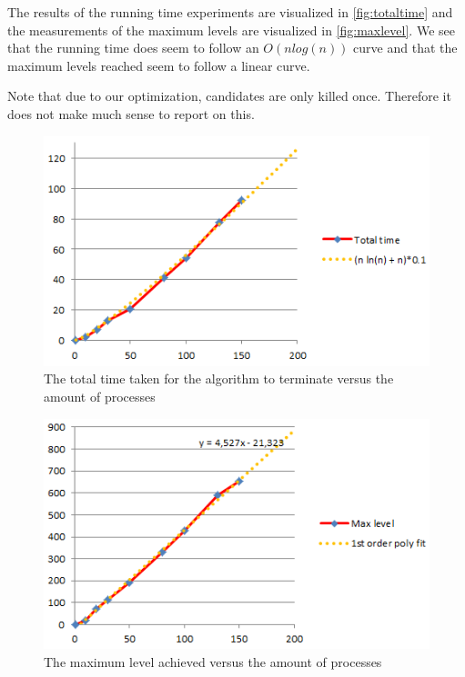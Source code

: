 \documentclass[12pt]{article}
\begin{document}
\quad The results of the running time experiments are visualized in \autoref{fig:totaltime} and the measurements of the
maximum levels are visualized in \autoref{fig:maxlevel}. We see that the running time does seem to follow an $O(n log(n))$ curve
and that the maximum levels reached seem to follow a linear curve.

\quad Note that due to our optimization, candidates are only killed once. Therefore it does not make much sense to report on this.

\begin{figure}[p]
    \centering
    \includegraphics{totaltime.png}
    \caption{The total time taken for the algorithm to terminate versus the amount of processes}
    \label{fig:totaltime}
\end{figure}

\begin{figure}[p]
    \centering
    \includegraphics{maxlevel.png}
    \caption{The maximum level achieved versus the amount of processes}
    \label{fig:maxlevel}
\end{figure}
\end{document}
